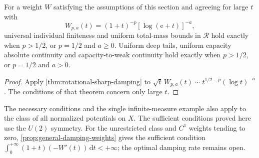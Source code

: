 \begin{corollary}\label{cor:rotational-power-log-weights}
For a weight $W$ satisfying the assumptions of this section and agreeing for large $t$ with
\[
 W_{p,a}(t)=(1+t)^{-p}[\log(\mathrm e+t)]^{-a},
\]
universal individual finiteness and uniform total-mass bounds in $\mathcal R$ hold exactly when $p>1/2$, or $p=1/2$ and $a\geq0$. Uniform deep tails, uniform capacity absolute continuity and capacity-to-weak continuity hold exactly when $p>1/2$, or $p=1/2$ and $a>0$.
\end{corollary}
\begin{proof}
Apply \cref{thm:rotational-sharp-damping} to $\sqrt t\,W_{p,a}(t)\sim t^{1/2-p}(\log t)^{-a}$. The conditions of that theorem concern only large $t$.
\end{proof}

The necessary conditions and the single infinite-measure example also apply to the class of all normalized potentials on $X$. The sufficient conditions proved here use the $U(2)$ symmetry. For the unrestricted class and $C^1$ weights tending to zero, \cref{prop:general-damping-weights} gives the sufficient condition $\int_0^{+\infty}(1+t)(-W'(t))\,\mathrm dt<+\infty$; the optimal damping rate remains open.
